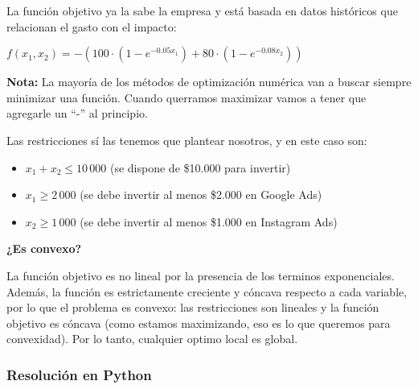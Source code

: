 \documentclass[12pt]{article}
\begin{document}
\vspace{1em}

La función objetivo ya la sabe la empresa y está basada en datos históricos que relacionan el gasto con el impacto:

\begin{center}
$\displaystyle f(x_1, x_2) = - \left( 100 \cdot \left(1 - e^{-0.05 x_1}\right) + 80 \cdot \left(1 - e^{-0.08 x_2}\right) \right)$
\end{center}

\textbf{Nota:} La mayoría de los métodos de optimización numérica van a buscar siempre minimizar una función. Cuando querramos maximizar vamos a tener que agregarle un ``-'' al principio.

\vspace{1em}

Las restricciones sí las tenemos que plantear nosotros, y en este caso son:
\begin{itemize}
    \item $x_1 + x_2 \leq 10\,000$ (se dispone de \$10.000 para invertir)
    \item $x_1 \geq 2\,000$ (se debe invertir al menos \$2.000 en Google Ads)
    \item $x_2 \geq 1\,000$ (se debe invertir al menos \$1.000 en Instagram Ads)
\end{itemize}

\vspace{0.3em}

\textbf{¿Es convexo?}

\vspace{0.3em}

La función objetivo es no lineal por la presencia de los terminos exponenciales. Además, la función es estrictamente creciente y cóncava respecto a cada variable, por lo que el problema es convexo: las restricciones son lineales y la función objetivo es cóncava (como estamos maximizando, eso es lo que queremos para convexidad). Por lo tanto, cualquier optimo local es global.

\subsubsection{Resolución en Python}
\end{document}
